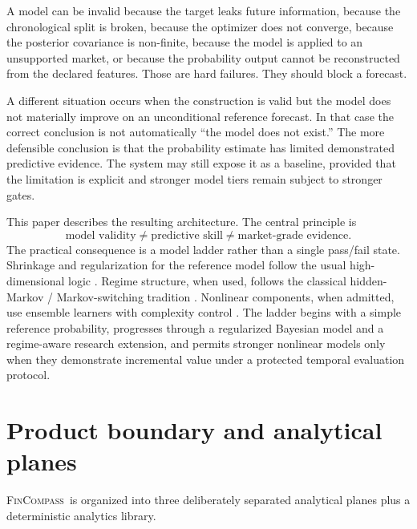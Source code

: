 \documentclass[11pt]{article}
\newcommand{\FC}{\textsc{FinCompass}}
\begin{document}
A model can be invalid because the target leaks future information, because the chronological split is broken, because the optimizer does not converge, because the posterior covariance is non-finite, because the model is applied to an unsupported market, or because the probability output cannot be reconstructed from the declared features. Those are hard failures. They should block a forecast.

A different situation occurs when the construction is valid but the model does not materially improve on an unconditional reference forecast. In that case the correct conclusion is not automatically ``the model does not exist.'' The more defensible conclusion is that the probability estimate has limited demonstrated predictive evidence. The system may still expose it as a baseline, provided that the limitation is explicit and stronger model tiers remain subject to stronger gates.

This paper describes the resulting architecture. The central principle is
\begin{equation}
\text{model validity}\neq\text{predictive skill}\neq\text{market-grade evidence}.
\end{equation}
The practical consequence is a model ladder rather than a single pass/fail state. Shrinkage and regularization for the reference model follow the usual high-dimensional logic \citep{hoerl1970ridge,tibshirani1996lasso,gelman2013book}. Regime structure, when used, follows the classical hidden-Markov / Markov-switching tradition \citep{hamilton1989regime,rabiner1989hmm,ang2002regime}. Nonlinear components, when admitted, use ensemble learners with complexity control \citep{breiman2001random,friedman2001greedy}. The ladder begins with a simple reference probability, progresses through a regularized Bayesian model and a regime-aware research extension, and permits stronger nonlinear models only when they demonstrate incremental value under a protected temporal evaluation protocol.

\section{Product boundary and analytical planes}
\FC\ is organized into three deliberately separated analytical planes plus a deterministic analytics library.
\end{document}
